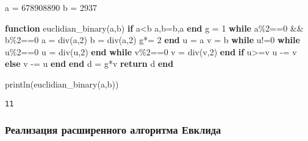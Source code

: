\documentclass[
]{article}
\newenvironment{Shaded}{}{}
\newcommand{\ControlFlowTok}[1]{\textcolor[rgb]{0.00,0.44,0.13}{\textbf{#1}}}
\newcommand{\FloatTok}[1]{\textcolor[rgb]{0.25,0.63,0.44}{#1}}
\newcommand{\FunctionTok}[1]{\textcolor[rgb]{0.02,0.16,0.49}{#1}}
\newcommand{\KeywordTok}[1]{\textcolor[rgb]{0.00,0.44,0.13}{\textbf{#1}}}
\newcommand{\NormalTok}[1]{#1}
\newcommand{\OperatorTok}[1]{\textcolor[rgb]{0.40,0.40,0.40}{#1}}
\begin{document}
\begin{Shaded}
\begin{Highlighting}[]
\NormalTok{a }\OperatorTok{=} \FloatTok{678908890}
\NormalTok{b }\OperatorTok{=} \FloatTok{2937}

\KeywordTok{function} \FunctionTok{euclidian\_binary}\NormalTok{(a,b)}
    \ControlFlowTok{if}\NormalTok{ a}\OperatorTok{\textless{}}\NormalTok{b}
\NormalTok{        a,b}\OperatorTok{=}\NormalTok{b,a}
    \ControlFlowTok{end}
\NormalTok{    g }\OperatorTok{=} \FloatTok{1}
    \ControlFlowTok{while}\NormalTok{ a}\OperatorTok{\%}\FloatTok{2}\OperatorTok{==}\FloatTok{0} \OperatorTok{\&\&}\NormalTok{ b}\OperatorTok{\%}\FloatTok{2}\OperatorTok{==}\FloatTok{0}
\NormalTok{        a }\OperatorTok{=} \FunctionTok{div}\NormalTok{(a,}\FloatTok{2}\NormalTok{)}
\NormalTok{        b }\OperatorTok{=} \FunctionTok{div}\NormalTok{(a,}\FloatTok{2}\NormalTok{)}
\NormalTok{        g}\OperatorTok{*=} \FloatTok{2}
    \ControlFlowTok{end}
\NormalTok{    u }\OperatorTok{=}\NormalTok{ a }
\NormalTok{    v }\OperatorTok{=}\NormalTok{ b}
    \ControlFlowTok{while}\NormalTok{ u}\OperatorTok{!=}\FloatTok{0}
        \ControlFlowTok{while}\NormalTok{ u}\OperatorTok{\%}\FloatTok{2}\OperatorTok{==}\FloatTok{0}
\NormalTok{            u }\OperatorTok{=} \FunctionTok{div}\NormalTok{(u,}\FloatTok{2}\NormalTok{)}
        \ControlFlowTok{end}
        \ControlFlowTok{while}\NormalTok{ v}\OperatorTok{\%}\FloatTok{2}\OperatorTok{==}\FloatTok{0}
\NormalTok{            v }\OperatorTok{=} \FunctionTok{div}\NormalTok{(v,}\FloatTok{2}\NormalTok{)}
        \ControlFlowTok{end}
        \ControlFlowTok{if}\NormalTok{ u}\OperatorTok{\textgreater{}=}\NormalTok{v}
\NormalTok{            u }\OperatorTok{{-}=}\NormalTok{ v }
        \ControlFlowTok{else}
\NormalTok{            v }\OperatorTok{{-}=}\NormalTok{ u}
        \ControlFlowTok{end} 
    \ControlFlowTok{end}
\NormalTok{    d }\OperatorTok{=}\NormalTok{ g}\OperatorTok{*}\NormalTok{v}
    \ControlFlowTok{return}\NormalTok{ d}
\KeywordTok{end}

\FunctionTok{println}\NormalTok{(}\FunctionTok{euclidian\_binary}\NormalTok{(a,b))}
\end{Highlighting}
\end{Shaded}

\begin{verbatim}
11
\end{verbatim}

\subsubsection{Реализация расширенного алгоритма
Евклида}\label{ux440ux435ux430ux43bux438ux437ux430ux446ux438ux44f-ux440ux430ux441ux448ux438ux440ux435ux43dux43dux43eux433ux43e-ux430ux43bux433ux43eux440ux438ux442ux43cux430-ux435ux432ux43aux43bux438ux434ux430}
\end{document}
